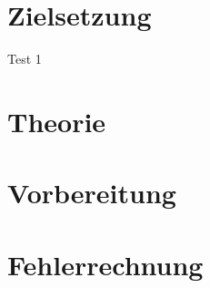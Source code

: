 


\section{Zielsetzung}

Test 1
\label{sec:Theorie}

\section{Theorie}

\section{Vorbereitung}

\section{Fehlerrechnung}
